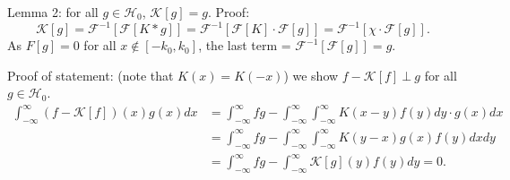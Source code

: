 \documentclass[11pt]{article}
\newcommand{\F}{\mathcal{F}}
\newcommand{\K}{\mathcal{K}}
\newcommand{\intr}{\int_{-\infty}^{\infty}}
\renewcommand{\H}{\mathcal{H}}
\begin{document}
\begin{enumerate}[label=\alph*)]
  Lemma 2: for all $g \in \H_0$, $\K[g] = g$. Proof:
  \begin{displaymath}
    \K[g] = \F^{-1}[\F[K*g]] = \F^{-1}[\F[K]\cdot\F[g]] = \F^{-1}[\chi\cdot\F[g]].
  \end{displaymath}
  As $F[g] = 0$ for all $x \notin [-k_0,k_0]$, the last term = $\F^{-1}[\F[g]] =
  g$.

  Proof of statement: (note that $K(x) = K(-x)$) we show $f - \K[f]~\bot~g$ for
  all $g \in \H_0$.
  \begin{align*}
    \intr(f-\K[f])(x)g(x)dx &= \intr fg - \intr\intr K(x-y)f(y)dy\cdot g(x)dx\\
                            &= \intr fg - \intr\intr K(y-x)g(x)f(y)dxdy\\
                            &= \intr fg - \intr \K[g](y)f(y)dy = 0.
  \end{align*}
\end{enumerate}
\end{document}
